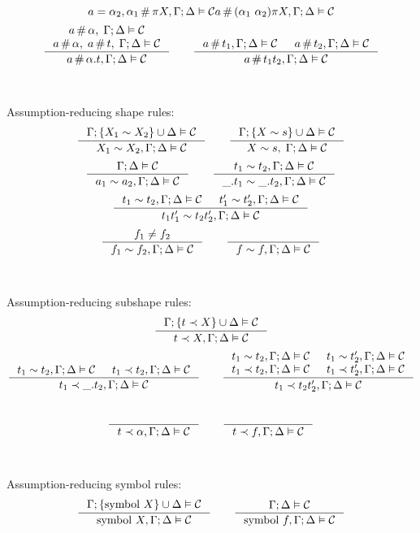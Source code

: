 \documentclass[english, mgr]{iithesis}
\begin{document}
\begin{appendices}
$${                           a =  \alpha_2, \alpha_1 \,\#\, \pi X, \Gamma ; \Delta \vDash \mathcal{C}
}{
  a \,\#\, (\alpha_1\ \alpha_2) \pi X, \Gamma ; \Delta \vDash \mathcal{C}
}
$$
$$
\inference{
  \atomv \cfresh \atomexp, \; \cEnv ; \icEnv \vDash \sconstr \\
  \atomv \cfresh \atomexp, \; \atomv \cfresh \term,\;\cEnv ; \icEnv \vDash \sconstr
}{
  \atomv \cfresh \tbind{\atomexp} \term , \cEnv ; \icEnv \vDash \sconstr
}
\qquad
\inference{
  \atomv \cfresh \term_1 , \cEnv ; \icEnv \vDash \sconstr &
  \atomv \cfresh \term_2 , \cEnv ; \icEnv \vDash \sconstr
}{
  \atomv \cfresh \term_1 \term_2 , \cEnv ; \icEnv \vDash \sconstr
}
$$
\\
\\
Assumption-reducing shape rules:
$$
\inference{
  \cEnv ; \{\termv_1 \csheq \termv_2\} \cup \icEnv \vDash \sconstr
}{
  \termv_1 \csheq \termv_2, \cEnv ; \icEnv \vDash \sconstr
}
\qquad
\inference{
  \cEnv ; \{\termv \csheq \shape\} \cup \icEnv \vDash \sconstr
}{
  \termv \csheq \shape,\; \cEnv ; \icEnv \vDash \sconstr
}
$$
$$
\inference{
  \cEnv ; \icEnv \vDash \sconstr
}{
  \atomv_1 \csheq \atomv_2, \cEnv ; \icEnv \vDash \sconstr
}
\qquad
\inference{
  \term_1 \csheq \term_2, \cEnv ; \icEnv \vDash \sconstr
}{
  \shbind\term_1 \csheq \shbind\term_2, \cEnv ; \icEnv \vDash \sconstr
}
$$
$$
\inference{
  \term_1  \csheq \term_2 , \cEnv ; \icEnv \vDash \sconstr
  &
  \term_1' \csheq \term_2', \cEnv ; \icEnv \vDash \sconstr
}{
  \term_1 \term_1' \csheq \term_2\term_2', \cEnv ; \icEnv \vDash \sconstr
}
$$
$$
\inference{
  \symb_1 \neq \symb_2
}{
  \symb_1 \csheq \symb_2 , \cEnv ; \icEnv \vDash \sconstr
}
\qquad
\inference{
}{
  \symb \csheq \symb , \cEnv ; \icEnv \vDash \sconstr
}
$$
\\
\\
Assumption-reducing subshape rules:
$$
\inference{
  \cEnv ; \{\term \cshlt \termv\} \cup \icEnv \vDash \sconstr
}{
  \term \cshlt \termv, \cEnv ; \icEnv \vDash \sconstr
}
$$
$$
\inference{
  \term_1 \csheq \term_2, \cEnv ; \icEnv \vDash \sconstr
  &
  \term_1 \cshlt \term_2, \cEnv ; \icEnv \vDash \sconstr
}{
  \term_1 \cshlt \shbind \term_2, \cEnv ; \icEnv \vDash \sconstr
}
\qquad
\inference{
  \term_1 \csheq \term_2, \cEnv ; \icEnv \vDash \sconstr
  &
  \term_1 \csheq \term_2', \cEnv ; \icEnv \vDash \sconstr
  \\
  \term_1 \cshlt \term_2, \cEnv ; \icEnv \vDash \sconstr
  &
  \term_1 \cshlt \term_2', \cEnv ; \icEnv \vDash \sconstr
}{
  \term_1 \cshlt \term_2 \term_2', \cEnv ; \icEnv \vDash \sconstr
}
$$
\\
$$
\inference{
}{
  \term \cshlt \atomexp, \cEnv ; \icEnv \vDash \sconstr
}
\qquad
\inference{
}{
  \term \cshlt \symb, \cEnv ; \icEnv \vDash \sconstr
}
$$
\\
\\
Assumption-reducing symbol rules:
$$
    \inference{
      \cEnv ; \{\csymb \termv\} \cup \icEnv \vDash \sconstr
    }{
      \csymb \termv, \cEnv ; \icEnv \vDash \sconstr
    }
    \qquad
    \inference{
      \cEnv ; \icEnv \vDash \sconstr
    }{
      \csymb \symb, \cEnv ; \icEnv \vDash \sconstr
    }
$$

\end{appendices}
\end{document}
